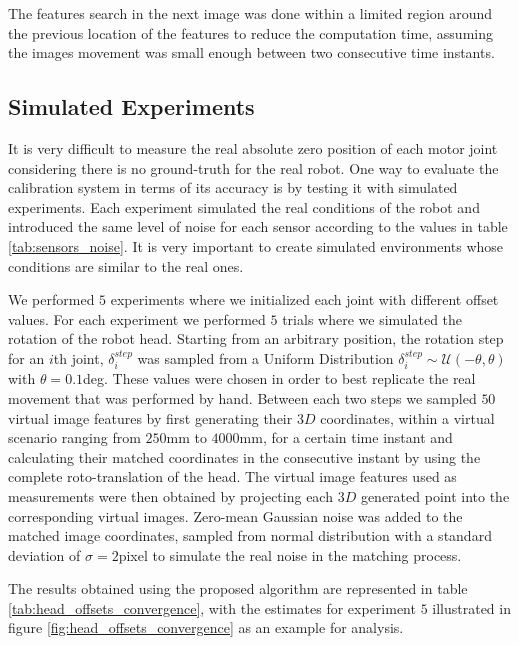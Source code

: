 The features search in the next image was done within a limited region around the previous location of the features to reduce the computation time, assuming the images movement was small enough between two consecutive time instants.

\subsection{Simulated Experiments}\label{sec:simulated_experiments}

It is very difficult to measure the real absolute zero position of each motor joint considering there is no ground-truth for the real robot. One way to evaluate the calibration system in terms of its accuracy is by testing it with simulated experiments. Each experiment simulated the real conditions of the robot and introduced the same level of noise for each sensor according to the values in table \ref{tab:sensors_noise}. It is very important to create simulated environments whose conditions are similar to the real ones.

We performed $5$ experiments where we initialized each joint with different offset values. For each experiment we performed $5$ trials where we simulated the rotation of the robot head. Starting from an arbitrary position, the rotation step for an $i$th joint, $\delta_i^{step}$ was sampled from a Uniform Distribution $\delta_i^{step}\sim\mathcal{U}\left(-\theta,\theta\right)$ with $\theta=0.1$deg. These values were chosen in order to best replicate the real movement that was performed by hand. Between each two steps we sampled $50$ virtual image features by first generating their $3D$ coordinates, within a virtual scenario ranging from $250$mm to $4000$mm, for a certain time instant and calculating their matched coordinates in the consecutive instant by using the complete roto-translation of the head. The virtual image features used as measurements were then obtained by projecting each $3D$ generated point into the corresponding virtual images. Zero-mean Gaussian noise was added to the matched image coordinates, sampled from normal distribution with a standard deviation of $\sigma=2$pixel to simulate the real noise in the matching process.

The results obtained using the proposed algorithm are represented in table \ref{tab:head_offsets_convergence}, with the estimates for experiment $5$ illustrated in figure \ref{fig:head_offsets_convergence} as an example for analysis.

